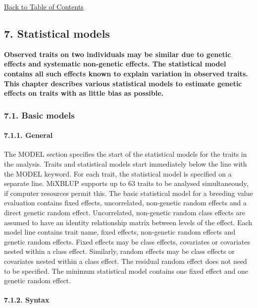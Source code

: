 \hyperref[Tabl01]{Back to Table of Contents}

\newpage

\subsection{7. Statistical models}\label{Stat01}

\textbf{Observed traits on two individuals may be similar due to genetic
effects and systematic non-genetic effects. The statistical model
contains all such effects known to explain variation in observed traits.
This chapter describes various statistical models to estimate genetic
effects on traits with as little bias as possible.}

\subsubsection{7.1. Basic models}\label{Stat02}

\paragraph{7.1.1. General}\label{Stat03}

The MODEL section specifies the start of the statistical models for the
traits in the analysis. Traits and statistical models start immediately
below the line with the MODEL keyword. For each trait, the statistical
model is specified on a separate line. MiXBLUP supports up to 63 traits
to be analysed simultaneously, if computer resources permit this. The
basic statistical model for a breeding value evaluation contains fixed
effects, uncorrelated, non-genetic random effects and a direct genetic
random effect. Uncorrelated, non-genetic random class effects are
assumed to have an identity relationship matrix between levels of the
effect. Each model line contains trait name, fixed effects, non-genetic
random effects and genetic random effects. Fixed effects may be class
effects, covariates or covariates nested within a class effect.
Similarly, random effects may be class effects or covariates nested
within a class effect. The residual random effect does not need to be
specified. The minimum statistical model contains one fixed effect and
one genetic random effect.

\paragraph{7.1.2. Syntax}\label{Stat04}

